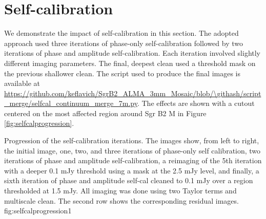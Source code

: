 \documentclass[twocolumn]{aastex61}
\begin{document}
\section{Self-calibration}
\label{sec:selfcal}
We demonstrate the impact of self-calibration in this section.  The adopted approach
used three iterations of phase-only self-calibration followed by two iterations of
phase and amplitude self-calibration.  Each iteration involved slightly
different imaging parameters.  The final, deepest clean used a threshold mask
on the previous shallower clean. The script used to produce the final images is
available at
\url{https://github.com/keflavich/SgrB2_ALMA_3mm_Mosaic/blob/\githash/script_merge/selfcal_continuum_merge_7m.py}.
The effects are shown with a cutout centered on the most affected region around
Sgr B2 M in Figure \ref{fig:selfcalprogression}.

{Progression of the self-calibration iterations.  The images show, from left to
right, the initial image, one, two, and three iterations of phase-only self
calibration, two iterations of phase and amplitude self-calibration,  a
reimaging of the 5th iteration with a deeper 0.1 mJy threshold using a mask at
the 2.5 mJy level, and finally, a sixth iteration of phase and amplitude
self-cal cleaned to 0.1 mJy over a region thresholded at 1.5 mJy.  All imaging
was done using two Taylor terms and multiscale clean.  The second row shows the
corresponding residual images.}
{fig:selfcalprogression}{1}{\textwidth}
\end{document}

